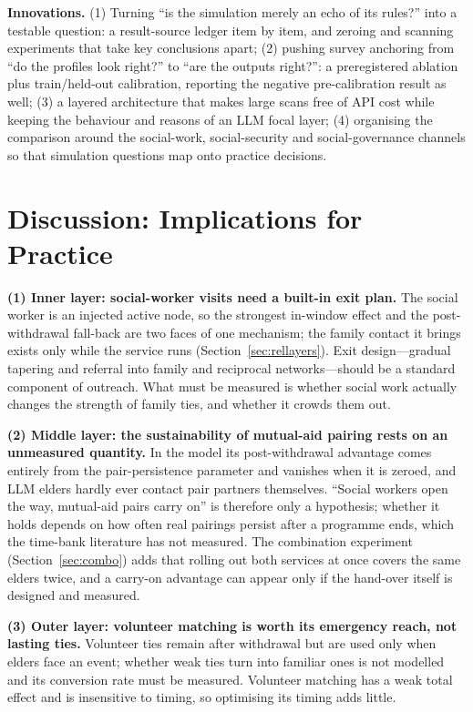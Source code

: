 \documentclass[10pt,twocolumn]{article}
\begin{document}
\textbf{Innovations.} (1) Turning ``is the simulation merely an echo of its rules?'' into a testable question: a result-source ledger item by item, and zeroing and scanning experiments that take key conclusions apart; (2) pushing survey anchoring from ``do the profiles look right?'' to ``are the outputs right?'': a preregistered ablation plus train/held-out calibration, reporting the negative pre-calibration result as well; (3) a layered architecture that makes large scans free of API cost while keeping the behaviour and reasons of an LLM focal layer; (4) organising the comparison around the social-work, social-security and social-governance channels so that simulation questions map onto practice decisions.

\section{Discussion: Implications for Practice}\label{sec:discussion}
\textbf{(1) Inner layer: social-worker visits need a built-in exit plan.} The social worker is an injected active node, so the strongest in-window effect and the post-withdrawal fall-back are two faces of one mechanism; the family contact it brings exists only while the service runs (Section~\ref{sec:rellayers}). Exit design---gradual tapering and referral into family and reciprocal networks---should be a standard component of outreach. What must be measured is whether social work actually changes the strength of family ties, and whether it crowds them out.

\textbf{(2) Middle layer: the sustainability of mutual-aid pairing rests on an unmeasured quantity.} In the model its post-withdrawal advantage comes entirely from the pair-persistence parameter and vanishes when it is zeroed, and LLM elders hardly ever contact pair partners themselves. ``Social workers open the way, mutual-aid pairs carry on'' is therefore only a hypothesis; whether it holds depends on how often real pairings persist after a programme ends, which the time-bank literature has not measured\citep{lu2024timebank}. The combination experiment (Section~\ref{sec:combo}) adds that rolling out both services at once covers the same elders twice, and a carry-on advantage can appear only if the hand-over itself is designed and measured.

\textbf{(3) Outer layer: volunteer matching is worth its emergency reach, not lasting ties.} Volunteer ties remain after withdrawal but are used only when elders face an event; whether weak ties turn into familiar ones is not modelled and its conversion rate must be measured. Volunteer matching has a weak total effect and is insensitive to timing, so optimising its timing adds little.
\end{document}

